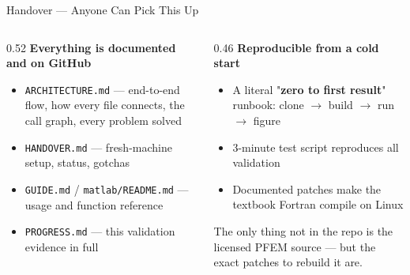 \documentclass[aspectratio=169]{beamer}
\begin{document}
\begin{frame}{Handover --- Anyone Can Pick This Up}
    \begin{columns}[t]
        \begin{column}{0.52\textwidth}
            \textbf{Everything is documented and on GitHub}
            \begin{itemize}
                \setlength\itemsep{0.3em}
                \item \texttt{ARCHITECTURE.md} --- end-to-end flow, how every file connects, the call graph, every problem solved
                \item \texttt{HANDOVER.md} --- fresh-machine setup, status, gotchas
                \item \texttt{GUIDE.md} / \texttt{matlab/README.md} --- usage and function reference
                \item \texttt{PROGRESS.md} --- this validation evidence in full
            \end{itemize}
        \end{column}
        \begin{column}{0.46\textwidth}
            \textbf{Reproducible from a cold start}
            \begin{itemize}
                \setlength\itemsep{0.3em}
                \item A literal "\textbf{zero to first result}" runbook: clone $\to$ build $\to$ run $\to$ figure
                \item 3-minute test script reproduces all validation
                \item Documented patches make the textbook Fortran compile on Linux
            \end{itemize}
            \vspace{0.3cm}
            {\small The only thing not in the repo is the licensed PFEM source --- but the exact patches to rebuild it are.}
        \end{column}
    \end{columns}
\end{frame}
\end{document}
